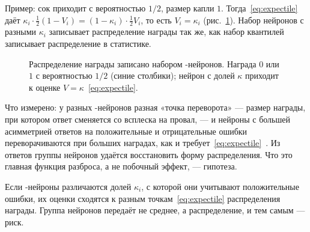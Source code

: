 Пример: сок приходит с вероятностью $1/2$, размер капли $1$. Тогда~\eqref{eq:expectile} даёт $\kappa_i\cdot\tfrac12(1-V_i)=(1-\kappa_i)\cdot\tfrac12V_i$, то есть $V_i=\kappa_i$ (рис.~\ref{fig:expectiles}). Набор нейронов с разными $\kappa_i$ записывает распределение награды так же, как набор квантилей записывает распределение в статистике.

\begin{figure}[t]
\centering
{}
\caption{Распределение награды записано набором -нейронов. Награда $0$ или $1$ с вероятностью $1/2$ (синие столбики); нейрон с долей $\kappa$ приходит к оценке $V=\kappa$~\eqref{eq:expectile}.}
\label{fig:expectiles}
\end{figure}

Что измерено: у разных -нейронов разная «точка переворота» --- размер награды, при котором ответ сменяется со всплеска на провал, --- и нейроны с большей асимметрией ответов на положительные и отрицательные ошибки переворачиваются при больших наградах, как и требует~\eqref{eq:expectile}~\cite{Dabney2020}. Из ответов группы нейронов удаётся восстановить форму распределения. Что это главная функция разброса, а не побочный эффект, --- гипотеза.

\begin{keyblock}
\begin{proposition}
\label{prop:expectile}
Если -нейроны различаются долей $\kappa_i$, с которой они учитывают положительные ошибки, их оценки сходятся к разным точкам~\eqref{eq:expectile} распределения награды. Группа нейронов передаёт не среднее, а распределение, и тем самым --- риск.
\end{proposition}
\end{keyblock}

